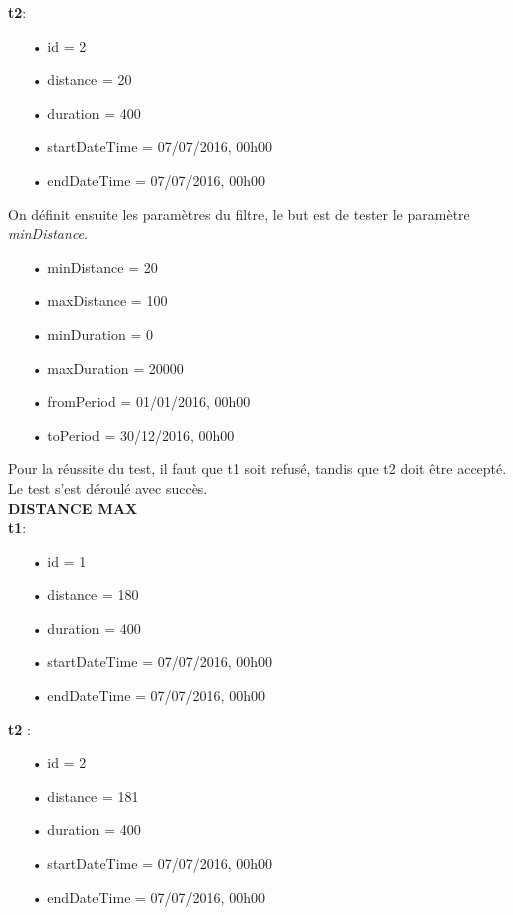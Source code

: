\documentclass[12pt]{article}
\begin{document}
	\textbf{t2}:\\
	\begin{itemize}
	\item[•] id = 2
	\item[•] distance = 20
	\item[•] duration = 400
	\item[•] startDateTime = 07/07/2016, 00h00
	\item[•] endDateTime = 07/07/2016, 00h00	
	\end{itemize}
	
	On définit ensuite les paramètres du filtre, le but est de tester le paramètre \textit{minDistance}.
	\begin{itemize}
	\item[•] minDistance = 20
	\item[•] maxDistance = 100
	\item[•] minDuration = 0
	\item[•] maxDuration = 20000
	\item[•] fromPeriod = 01/01/2016, 00h00
	\item[•] toPeriod = 30/12/2016, 00h00
	\end{itemize}

	Pour la réussite du test, il faut que t1 soit refusé, tandis que t2 doit être accepté.\\

	Le test s’est déroulé avec succès.\\

	\textbf{DISTANCE MAX}\\
	
	\textbf{t1}:\\
	\begin{itemize}
	\item[•] id = 1
	\item[•] distance = 180
	\item[•] duration = 400
	\item[•] startDateTime = 07/07/2016, 00h00
	\item[•] endDateTime = 07/07/2016, 00h00
	\end{itemize}
		
	\textbf{t2} :
	\begin{itemize}
	\item[•] id = 2
	\item[•] distance = 181
	\item[•] duration = 400
	\item[•] startDateTime = 07/07/2016, 00h00
	\item[•] endDateTime = 07/07/2016, 00h00
	\end{itemize}
\end{document}
